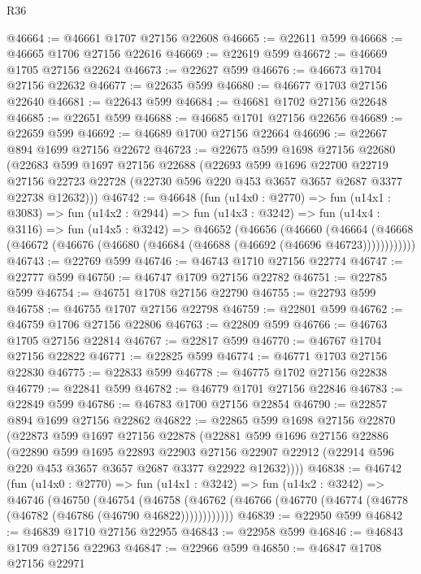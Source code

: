 \begin{lexlean}{R36}
\begin{coremodule}
@46664 := @46661 @1707 @27156 @22608
@46665 := @22611 @599
@46668 := @46665 @1706 @27156 @22616
@46669 := @22619 @599
@46672 := @46669 @1705 @27156 @22624
@46673 := @22627 @599
@46676 := @46673 @1704 @27156 @22632
@46677 := @22635 @599
@46680 := @46677 @1703 @27156 @22640
@46681 := @22643 @599
@46684 := @46681 @1702 @27156 @22648
@46685 := @22651 @599
@46688 := @46685 @1701 @27156 @22656
@46689 := @22659 @599
@46692 := @46689 @1700 @27156 @22664
@46696 := @22667 @894 @1699 @27156 @22672
@46723 := @22675
    @599
    @1698
    @27156
    @22680
    (@22683
      @599
      @1697
      @27156
      @22688
      (@22693
        @599
        @1696
        @22700
        @22719
        @27156
        @22723
        @22728
        (@22730 @596 @220 @453 @3657 @3657 @2687 @3377 @22738 @12632)))
@46742 := @46648
    (fun (u14x0 : @2770) =>
    fun (u14x1 : @3083) =>
    fun (u14x2 : @2944) =>
    fun (u14x3 : @3242) =>
    fun (u14x4 : @3116) =>
    fun (u14x5 : @3242) =>
    @46652
      (@46656
        (@46660
          (@46664 (@46668 (@46672 (@46676 (@46680 (@46684 (@46688 (@46692 (@46696 @46723))))))))))))
@46743 := @22769 @599
@46746 := @46743 @1710 @27156 @22774
@46747 := @22777 @599
@46750 := @46747 @1709 @27156 @22782
@46751 := @22785 @599
@46754 := @46751 @1708 @27156 @22790
@46755 := @22793 @599
@46758 := @46755 @1707 @27156 @22798
@46759 := @22801 @599
@46762 := @46759 @1706 @27156 @22806
@46763 := @22809 @599
@46766 := @46763 @1705 @27156 @22814
@46767 := @22817 @599
@46770 := @46767 @1704 @27156 @22822
@46771 := @22825 @599
@46774 := @46771 @1703 @27156 @22830
@46775 := @22833 @599
@46778 := @46775 @1702 @27156 @22838
@46779 := @22841 @599
@46782 := @46779 @1701 @27156 @22846
@46783 := @22849 @599
@46786 := @46783 @1700 @27156 @22854
@46790 := @22857 @894 @1699 @27156 @22862
@46822 := @22865
    @599
    @1698
    @27156
    @22870
    (@22873
      @599
      @1697
      @27156
      @22878
      (@22881
        @599
        @1696
        @27156
        @22886
        (@22890
          @599
          @1695
          @22893
          @22903
          @27156
          @22907
          @22912
          (@22914 @596 @220 @453 @3657 @3657 @2687 @3377 @22922 @12632))))
@46838 := @46742
    (fun (u14x0 : @2770) =>
    fun (u14x1 : @3242) =>
    fun (u14x2 : @3242) =>
    @46746
      (@46750
        (@46754
          (@46758 (@46762 (@46766 (@46770 (@46774 (@46778 (@46782 (@46786 (@46790 @46822))))))))))))
@46839 := @22950 @599
@46842 := @46839 @1710 @27156 @22955
@46843 := @22958 @599
@46846 := @46843 @1709 @27156 @22963
@46847 := @22966 @599
@46850 := @46847 @1708 @27156 @22971

\end{coremodule}
\end{lexlean}
